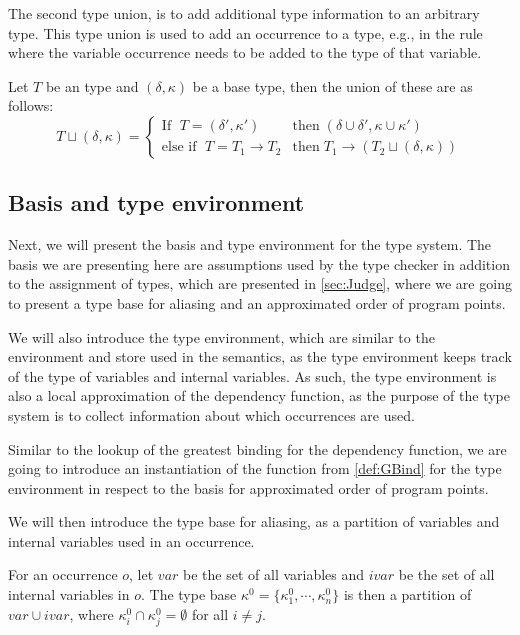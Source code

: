 \documentclass[../../master.tex]{subfiles}
\begin{document}
The second type union, is to add additional type information to an arbitrary type.
This type union is used to add an occurrence to a type, e.g., in the  rule where the variable occurrence needs to be added to the type of that variable.
\begin{definition}
	Let $T$ be an type and $(\delta,\kappa)$ be a base type, then the union of these are as follows:
	\begin{equation*}
		T\sqcup (\delta,\kappa)=
		\left\{\begin{matrix}
			\mbox{If } \; T=(\delta',\kappa')  & \mbox{then} \; (\delta\cup\delta',\kappa\cup\kappa')\\
			\mbox{else if } \; T=T_1\rightarrow T_2 & \mbox{then} \; T_1\rightarrow(T_2\sqcup (\delta,\kappa))
		\end{matrix}\right.
	\end{equation*}
\end{definition}

\subsection{Basis and type environment}\label{sec:basis}
Next, we will present the basis and type environment for the type system.
The basis we are presenting here are assumptions used by the type checker in addition to the assignment of types, which are presented in \cref{sec:Judge}, where we are going to present a type base for aliasing and an approximated order of program points.

We will also introduce the type environment, which are similar to the environment and store used in the semantics, as the type environment keeps track of the type of variables and internal variables.
As such, the type environment is also a local approximation of the dependency function, as the purpose of the type system is to collect information about which occurrences are used.

Similar to the lookup of the greatest binding for the dependency function, we are going to introduce an instantiation of the function from \cref{def:GBind} for the type environment in respect to the basis for approximated order of program points.
\bigskip

We will then introduce the type base for aliasing, as a partition of variables and internal variables used in an occurrence.

\begin{definition}
	For an occurrence $o$, let $var$ be the set of all variables and $ivar$ be the set of all internal variables in $o$.
	The type base $\kappa^0=\{\kappa^0_1,\cdots,\kappa^0_n\}$ is then a partition of $var\cup ivar$, where $\kappa_i^0\cap\kappa_j^0=\emptyset$ for all $i\neq j$.
\end{definition}
\end{document}
